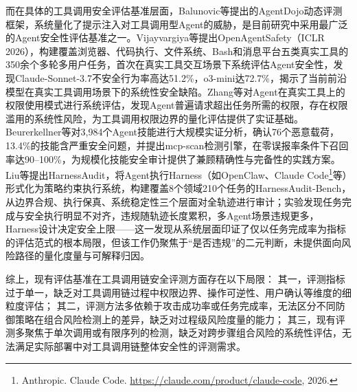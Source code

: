 而在具体的工具调用安全评估基准层面，Balunovic等\cite{balunovic2024agentdojo}提出的AgentDojo动态评测框架，系统量化了提示注入对工具调用型Agent的威胁，是目前研究中采用最广泛的Agent安全性评估基准之一\cite{chen2025struq,li2025drift,wu2025isolategpt,an2025ipiguard,li2025piguard,zhan2025adaptive,hung2025attention,debenedetti2025camel,costa2025fides}。Vijayvargiya等\cite{vijayvargiya2025openagentsafety}提出OpenAgentSafety（ICLR 2026），构建覆盖浏览器、代码执行、文件系统、Bash和消息平台五类真实工具的350余个多轮多用户任务，首次在真实工具交互场景下系统评估Agent安全性，发现Claude-Sonnet-3.7不安全行为率高达51.2\%，o3-mini达72.7\%，揭示了当前前沿模型在真实工具调用场景下的系统性安全缺陷。Zhang等\cite{zhang2026evaluatingprivilege}对Agent在真实工具上的权限使用模式进行系统评估，发现Agent普遍请求超出任务所需的权限，存在权限滥用的系统性风险，为工具调用权限边界的量化评估提供了实证基础。Beurerkellner等\cite{beurerkellner2026technical}对3,984个Agent技能进行大规模实证分析，确认76个恶意载荷，13.4\%的技能含严重安全问题，并提出mcp-scan检测引擎，在零误报率条件下召回率达90--100\%，为规模化技能安全审计提供了兼顾精确性与完备性的实践方案。Liu等\cite{liu2026auditing}提出HarnessAudit，将Agent执行Harness（如OpenClaw、Claude Code\footnote{Anthropic. Claude Code. \url{https://claude.com/product/claude-code}, 2026.}等）形式化为策略约束执行系统，构建覆盖8个领域210个任务的HarnessAudit-Bench，从边界合规、执行保真、系统稳定性三个层面对全轨迹进行审计；实验发现任务完成与安全执行明显不对齐，违规随轨迹长度累积，多Agent场景违规更多，Harness设计决定安全上限——这一发现从系统层面印证了仅以任务完成率为指标的评估范式的根本局限，但该工作仍聚焦于“是否违规”的二元判断，未提供面向风险路径的量化度量与可解释归因。

综上，现有评估基准在工具调用链安全评测方面存在以下局限：
其一，评测指标过于单一，缺乏对工具调用链过程中权限边界、操作可逆性、用户确认等维度的细粒度评估；
其二，评测方法多依赖于攻击成功率或任务完成率，无法区分不同防御策略在组合风险检测上的差异，缺乏对过程级风险度量的能力；
其三，现有评测多聚焦于单次调用或有限序列的检测，缺乏对跨步骤组合风险的系统性评估，无法满足实际部署中对工具调用链整体安全性的评测需求。


